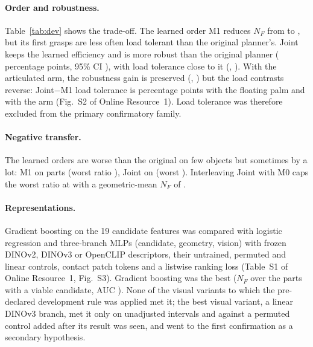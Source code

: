 \documentclass[pdflatex,sn-mathphys-num,iicol]{sn-jnl}
\begin{document}
\paragraph{Order and robustness.} Table~\ref{tab:dev} shows the trade-off. The learned order M1 reduces $N_F$ from \devNFMzero{} to \devNFMone, but its first grasps are less often load tolerant than the original planner's. Joint keeps the learned efficiency and is more robust than the original planner (\devJointMzeroRobust{} percentage points, 95\% CI \devJointMzeroRobustCI), with load tolerance close to it (\devJointMzeroLoad, \devJointMzeroLoadCI). With the articulated arm, the robustness gain is preserved (\artJointMzeroRobust, \artJointMzeroRobustCI) but the load contrasts reverse: Joint$-$M1 load tolerance is \devJointMoneLoad{} percentage points with the floating palm and \artJointMoneLoad{} \artJointMoneLoadCI{} with the arm (Fig.~S2 of Online Resource~1). Load tolerance was therefore excluded from the primary confirmatory family.

\begin{table}[t]
\caption{Development (\devParts{} GSO parts, out of fold): geometric-mean $N_F$ and the share of first viable grasps that are robust or load tolerant under the corrected (v3) and the previous (v2) criteria; torsion 0.005~m.}\label{tab:dev}
\centering\small

\end{table}

\paragraph{Negative transfer.} The learned orders are worse than the original on few objects but sometimes by a lot: M1 on \devNegMone{} parts (worst ratio \devWorstMone), Joint on \devNegJoint{} (worst \devWorstJoint). Interleaving Joint with M0 caps the worst ratio at \devHybridWorst{} with a geometric-mean $N_F$ of \devHybridNF.

\paragraph{Representations.} Gradient boosting on the 19 candidate features was compared with logistic regression and three-branch MLPs (candidate, geometry, vision) with frozen DINOv2, DINOv3 or OpenCLIP descriptors, their untrained, permuted and linear controls, contact patch tokens and a listwise ranking loss \cite{cao2007listnet} (Table~S1 of Online Resource~1, Fig.~S3). Gradient boosting was the best ($N_F$ \repNFLzero{} over the \repViable{} parts with a viable candidate, AUC \repAUCLzero). None of the visual variants to which the pre-declared development rule was applied met it; the best visual variant, a linear DINOv3 branch, met it only on unadjusted intervals and against a permuted control added after its result was seen, and went to the first confirmation as a secondary hypothesis.
\end{document}
